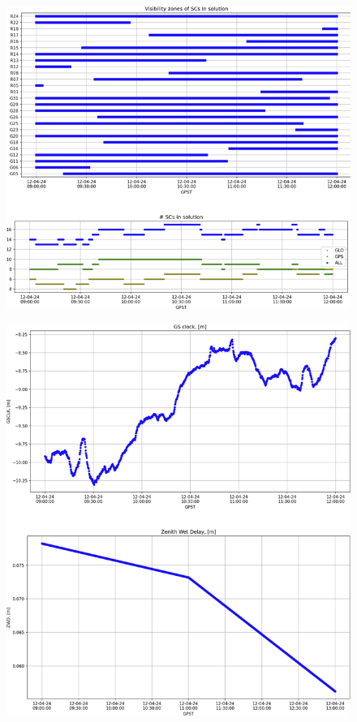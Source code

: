 \begin{figure}[hp]
	\centering
	\includegraphics[width=\linewidth]{images/picC03}
\end{figure}

\begin{figure}[hp]
	\centering
	\includegraphics[width=\linewidth]{images/picC04}
\end{figure}

